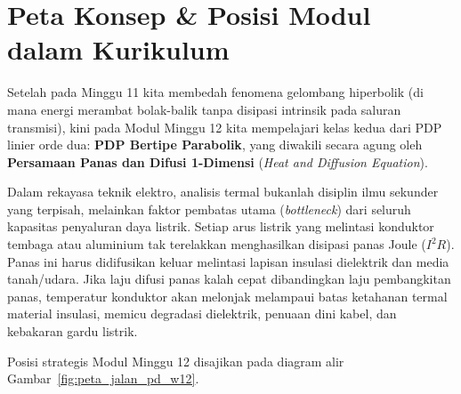 \documentclass[11pt,a4paper]{article}
\theoremstyle{definition}
\begin{document}
\vspace{0.3cm}
\tableofcontents
\vspace{0.5cm}

\newpage

\section{Peta Konsep \& Posisi Modul dalam Kurikulum}

Setelah pada Minggu 11 kita membedah fenomena gelombang hiperbolik (di mana energi merambat bolak-balik tanpa disipasi intrinsik pada saluran transmisi), kini pada Modul Minggu 12 kita mempelajari kelas kedua dari PDP linier orde dua: \textbf{PDP Bertipe Parabolik}, yang diwakili secara agung oleh \textbf{Persamaan Panas dan Difusi 1-Dimensi} (\textit{Heat and Diffusion Equation}).

Dalam rekayasa teknik elektro, analisis termal bukanlah disiplin ilmu sekunder yang terpisah, melainkan faktor pembatas utama (\textit{bottleneck}) dari seluruh kapasitas penyaluran daya listrik. Setiap arus listrik yang melintasi konduktor tembaga atau aluminium tak terelakkan menghasilkan disipasi panas Joule ($I^2 R$). Panas ini harus didifusikan keluar melintasi lapisan insulasi dielektrik dan media tanah/udara. Jika laju difusi panas kalah cepat dibandingkan laju pembangkitan panas, temperatur konduktor akan melonjak melampaui batas ketahanan termal material insulasi, memicu degradasi dielektrik, penuaan dini kabel, dan kebakaran gardu listrik.

Posisi strategis Modul Minggu 12 disajikan pada diagram alir Gambar~\ref{fig:peta_jalan_pd_w12}.
\end{document}
